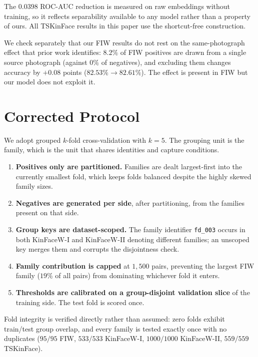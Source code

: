 \documentclass[journal,12pt]{IEEEtran}
\begin{document}
The $0.0398$ ROC-AUC reduction is measured on raw embeddings without training,
so it reflects separability available to any model rather than a property of
ours. All TSKinFace results in this paper use the shortcut-free construction.

We check separately that our FIW results do not rest on the same-photograph
effect that prior work identifies: $8.2\%$ of FIW positives are drawn from a
single source photograph (against $0\%$ of negatives), and excluding them
changes accuracy by $+0.08$ points ($82.53\% \to 82.61\%$). The effect is
present in FIW but our model does not exploit it.

\section{Corrected Protocol}
\label{sec:protocol}

We adopt grouped $k$-fold cross-validation with $k=5$. The grouping unit is the
family, which is the unit that shares identities and capture conditions.

\begin{enumerate}
\item \textbf{Positives only are partitioned.} Families are dealt largest-first
into the currently smallest fold, which keeps folds balanced despite the highly
skewed family sizes.
\item \textbf{Negatives are generated per side}, after partitioning, from the
families present on that side.
\item \textbf{Group keys are dataset-scoped.} The family identifier
\texttt{fd\_003} occurs in both KinFaceW-I and KinFaceW-II denoting different
families; an unscoped key merges them and corrupts the disjointness check.
\item \textbf{Family contribution is capped} at $1{,}500$ pairs, preventing the
largest FIW family ($19\%$ of all pairs) from dominating whichever fold it
enters.
\item \textbf{Thresholds are calibrated on a group-disjoint validation slice} of
the training side. The test fold is scored once.
\end{enumerate}

Fold integrity is verified directly rather than assumed: zero folds exhibit
train/test group overlap, and every family is tested exactly once with no
duplicates ($95/95$ FIW, $533/533$ KinFaceW-I, $1000/1000$ KinFaceW-II,
$559/559$ TSKinFace).
\end{document}
